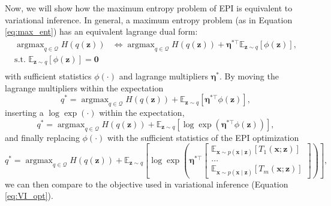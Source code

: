 \documentclass[11pt]{article}
\DeclareMathOperator*{\argmax}{argmax}
\begin{document}
Now, we will show how the maximum entropy problem of EPI is equivalent to variational inference.
In general, a maximum entropy problem (as in Equation \ref{eq:max_ent}) has an equivalent lagrange dual form:
\begin{equation}
\begin{split}
\argmax_{q \in \mathcal{Q}} H(q(\mathbf{z})) &\Longleftrightarrow \argmax_{q \in \mathcal{Q}} H(q(\mathbf{z})) + \bm{\eta}^{*\top} \mathbb{E}_{\mathbf{z} \sim q} \left[ \phi(\mathbf{z}) \right], \\
  \text{s.t.  } \mathbb{E}_{\mathbf{z} \sim q}\left[\phi(\mathbf{z})\right] = \mathbf{0}~& \\
 \end{split}
\end{equation} 
with sufficient statistics $\phi(\cdot)$ and lagrange multipliers $\bm{\eta}^*$.
By moving the lagrange multipliers within the expectation
\begin{equation}q^* = \argmax_{q \in \mathcal{Q}} H(q(\mathbf{z})) + \mathbb{E}_{\mathbf{z} \sim q} \left[\bm{\eta}^{*\top} \phi(\mathbf{z}) \right],
\end{equation} 
inserting a $\log \exp(\cdot)$ within the expectation, 
\begin{equation} q^* = \argmax_{q \in \mathcal{Q}} H(q(\mathbf{z})) + \mathbb{E}_{\mathbf{z} \sim q} \left[\log \exp \left( \bm{\eta}^{*\top} \phi(\mathbf{z}) \right) \right],
\end{equation}
and finally replacing $\phi(\cdot)$ with the sufficient statistics of the EPI optimization
\begin{equation} \label{eq:epi_vi}
q^* = \argmax_{q \in \mathcal{Q}} H(q(\mathbf{z})) + \mathbb{E}_{\mathbf{z} \sim q} \left[\log \exp \left( \bm{\eta}^{*\top} \begin{bmatrix} \mathbb{E}_{\mathbf{x} \sim p(\mathbf{x} \mid \mathbf{z})} \left[ T_1(\mathbf{x}; \mathbf{z}) \right] \\ ... \\ \mathbb{E}_{\mathbf{x} \sim p(\mathbf{x} \mid \mathbf{z})} \left[ T_m(\mathbf{x}; \mathbf{z}) \right] \end{bmatrix} \right) \right],
\end{equation}
we can then compare to the objective used in variational inference  (Equation \ref{eq:VI_opt}).
\end{document}

